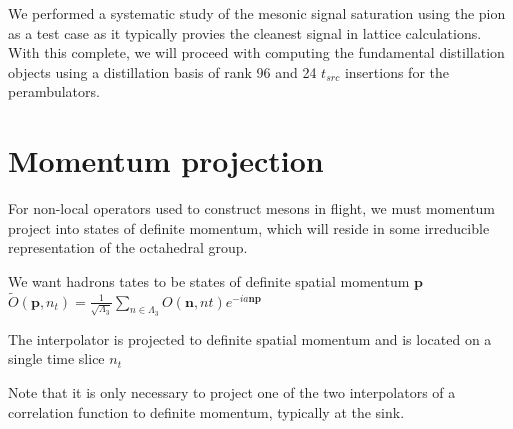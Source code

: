 We performed a systematic study of the mesonic signal saturation using the pion as a test case as it typically provies the cleanest signal in lattice calculations. With this complete, we will proceed with computing the fundamental distillation objects using a distillation basis of rank 96 and 24 $t_{src}$ insertions for the perambulators. 


\newpage

\section{Momentum projection}
For non-local operators used to construct mesons in flight, we must momentum project into states of definite momentum, which will reside in some irreducible representation of the octahedral group. 

We want hadrons tates to be states of definite spatial momentum $\textbf{p}$ 
$\tilde{O}(\textbf{p},n_t) = \frac{1}{\sqrt{\Lambda_3}} \sum_{n\in\Lambda_3} O(\textbf{n},nt)e^{-ia\textbf{np}}$ 

The interpolator is projected to definite spatial momentum and is located on a single time slice $n_t$

Note that it is only necessary to project one of the two interpolators of a correlation function to definite momentum, typically at the sink. 



